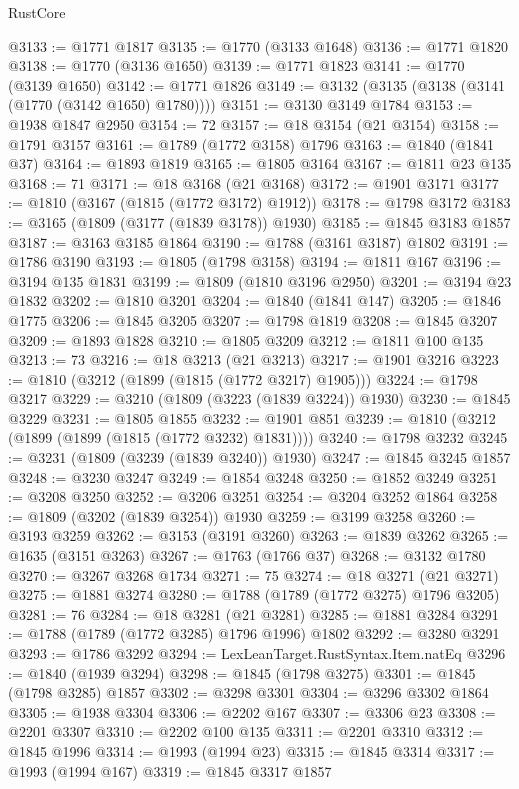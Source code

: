 \begin{lexlean}{RustCore}
\begin{coremodule}
@3133 := @1771 @1817
@3135 := @1770 (@3133 @1648)
@3136 := @1771 @1820
@3138 := @1770 (@3136 @1650)
@3139 := @1771 @1823
@3141 := @1770 (@3139 @1650)
@3142 := @1771 @1826
@3149 := @3132 (@3135 (@3138 (@3141 (@1770 (@3142 @1650) @1780))))
@3151 := @3130 @3149 @1784
@3153 := @1938 @1847 @2950
@3154 := 72
@3157 := @18 @3154 (@21 @3154)
@3158 := @1791 @3157
@3161 := @1789 (@1772 @3158) @1796
@3163 := @1840 (@1841 @37)
@3164 := @1893 @1819
@3165 := @1805 @3164
@3167 := @1811 @23 @135
@3168 := 71
@3171 := @18 @3168 (@21 @3168)
@3172 := @1901 @3171
@3177 := @1810 (@3167 (@1815 (@1772 @3172) @1912))
@3178 := @1798 @3172
@3183 := @3165 (@1809 (@3177 (@1839 @3178)) @1930)
@3185 := @1845 @3183 @1857
@3187 := @3163 @3185 @1864
@3190 := @1788 (@3161 @3187) @1802
@3191 := @1786 @3190
@3193 := @1805 (@1798 @3158)
@3194 := @1811 @167
@3196 := @3194 @135 @1831
@3199 := @1809 (@1810 @3196 @2950)
@3201 := @3194 @23 @1832
@3202 := @1810 @3201
@3204 := @1840 (@1841 @147)
@3205 := @1846 @1775
@3206 := @1845 @3205
@3207 := @1798 @1819
@3208 := @1845 @3207
@3209 := @1893 @1828
@3210 := @1805 @3209
@3212 := @1811 @100 @135
@3213 := 73
@3216 := @18 @3213 (@21 @3213)
@3217 := @1901 @3216
@3223 := @1810 (@3212 (@1899 (@1815 (@1772 @3217) @1905)))
@3224 := @1798 @3217
@3229 := @3210 (@1809 (@3223 (@1839 @3224)) @1930)
@3230 := @1845 @3229
@3231 := @1805 @1855
@3232 := @1901 @851
@3239 := @1810 (@3212 (@1899 (@1899 (@1815 (@1772 @3232) @1831))))
@3240 := @1798 @3232
@3245 := @3231 (@1809 (@3239 (@1839 @3240)) @1930)
@3247 := @1845 @3245 @1857
@3248 := @3230 @3247
@3249 := @1854 @3248
@3250 := @1852 @3249
@3251 := @3208 @3250
@3252 := @3206 @3251
@3254 := @3204 @3252 @1864
@3258 := @1809 (@3202 (@1839 @3254)) @1930
@3259 := @3199 @3258
@3260 := @3193 @3259
@3262 := @3153 (@3191 @3260)
@3263 := @1839 @3262
@3265 := @1635 (@3151 @3263)
@3267 := @1763 (@1766 @37)
@3268 := @3132 @1780
@3270 := @3267 @3268 @1734
@3271 := 75
@3274 := @18 @3271 (@21 @3271)
@3275 := @1881 @3274
@3280 := @1788 (@1789 (@1772 @3275) @1796 @3205)
@3281 := 76
@3284 := @18 @3281 (@21 @3281)
@3285 := @1881 @3284
@3291 := @1788 (@1789 (@1772 @3285) @1796 @1996) @1802
@3292 := @3280 @3291
@3293 := @1786 @3292
@3294 := LexLeanTarget.RustSyntax.Item.natEq
@3296 := @1840 (@1939 @3294)
@3298 := @1845 (@1798 @3275)
@3301 := @1845 (@1798 @3285) @1857
@3302 := @3298 @3301
@3304 := @3296 @3302 @1864
@3305 := @1938 @3304
@3306 := @2202 @167
@3307 := @3306 @23
@3308 := @2201 @3307
@3310 := @2202 @100 @135
@3311 := @2201 @3310
@3312 := @1845 @1996
@3314 := @1993 (@1994 @23)
@3315 := @1845 @3314
@3317 := @1993 (@1994 @167)
@3319 := @1845 @3317 @1857

\end{coremodule}
\end{lexlean}
